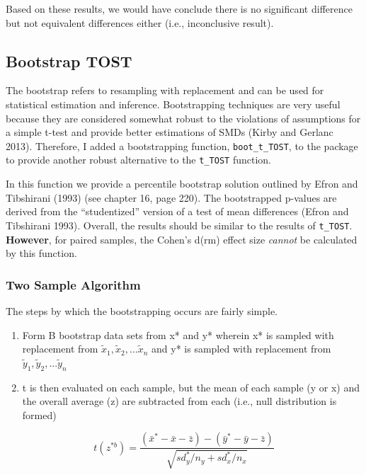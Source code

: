 \documentclass[
]{interact}
\begin{document}
Based on these results, we would have conclude there is no significant
difference but not equivalent differences either (i.e., inconclusive
result).

\newpage

\hypertarget{bootstrap-tost}{%
\subsection{Bootstrap TOST}\label{bootstrap-tost}}

The bootstrap refers to resampling with replacement and can be used for
statistical estimation and inference. Bootstrapping techniques are very
useful because they are considered somewhat robust to the violations of
assumptions for a simple t-test and provide better estimations of SMDs
(Kirby and Gerlanc 2013). Therefore, I added a bootstrapping function,
\texttt{boot\_t\_TOST}, to the package to provide another robust
alternative to the \texttt{t\_TOST} function.

In this function we provide a percentile bootstrap solution outlined by
Efron and Tibshirani (1993) (see chapter 16, page 220). The bootstrapped
p-values are derived from the ``studentized'' version of a test of mean
differences (Efron and Tibshirani 1993). Overall, the results should be
similar to the results of \texttt{t\_TOST}. \textbf{However}, for paired
samples, the Cohen's d(rm) effect size \emph{cannot} be calculated by
this function.

\hypertarget{two-sample-algorithm}{%
\subsubsection{Two Sample Algorithm}\label{two-sample-algorithm}}

The steps by which the bootstrapping occurs are fairly simple.

\begin{enumerate}
\def\labelenumi{\arabic{enumi}.}
\item
  Form B bootstrap data sets from x* and y* wherein x* is sampled with
  replacement from \(\tilde x_1,\tilde x_2, ... \tilde x_n\) and y* is
  sampled with replacement from
  \(\tilde y_1,\tilde y_2, ... \tilde y_n\)
\item
  t is then evaluated on each sample, but the mean of each sample (y or
  x) and the overall average (z) are subtracted from each (i.e., null
  distribution is formed)
\end{enumerate}

\[
t(z^{*b}) = \frac {(\bar x^*-\bar x - \bar z) - (\bar y^*-\bar y - \bar z)}{\sqrt {sd_y^*/n_y + sd_x^*/n_x}}
\]
\end{document}
